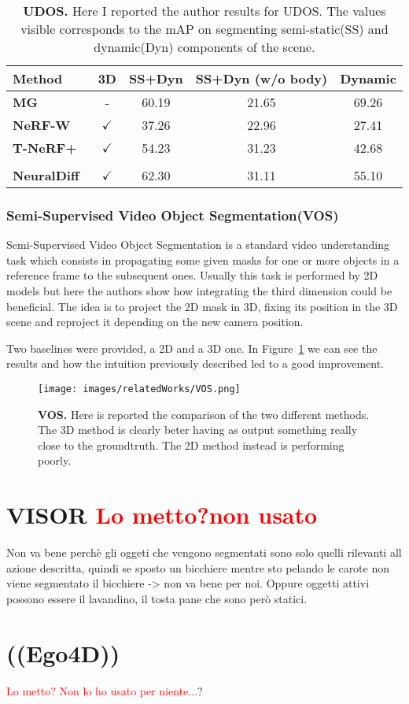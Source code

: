 \begin{table}
    \begin{tabular}{lcccc}
        \hline \textbf{Method} & \textbf{3D} & \textbf{SS+Dyn} & \textbf{SS+Dyn (w/o body)} &\textbf{ Dynamic} \\
        \hline \textbf{MG} ~\cite{MG} & - & 60.19 & 21.65 & 69.26 \\
        \textbf{NeRF-W} ~\cite{nerfw} & $\checkmark$ & 37.26 & 22.96 & 27.41 \\
        \textbf{T-NeRF+}~\cite{Tnerf} & $\checkmark$ & 54.23 & 31.23 & 42.68 \\
        & & & & \\
        \textbf{NeuralDiff}~\cite{neuraldiff}& $\checkmark$ & 62.30 & 31.11 & 55.10 \\
        \hline
        \end{tabular}
        \caption{\textbf{UDOS.} Here I reported the author results for UDOS. The values visible corresponds to the mAP on segmenting semi-static(SS) 
        and dynamic(Dyn) components of the scene.}\label{tab:UDOS}
\end{table}

\subsubsection{Semi-Supervised Video Object Segmentation(VOS)}
Semi-Supervised Video Object Segmentation is a standard video understanding task which consists in propagating some given masks for one or more
objects in a reference frame to the subsequent ones. Usually this task is performed by 2D models but here the authors show how integrating the third dimension
could be beneficial. The idea is to project the 2D mask in 3D, fixing its position in the 3D scene and reproject it depending on the new camera position.

Two baselines were provided, a 2D and a 3D one. In Figure~\ref{fig:VOS} we can see the results and how the intuition previously described led to a good improvement.
\begin{figure}
    \centering
    \texttt{[image: images/relatedWorks/VOS.png]} 
    \caption{\textbf{VOS.} Here is reported the comparison of the two different methods.
    The 3D method is clearly beter having as output something really close to the groundtruth. The 2D method instead is performing poorly.}\label{fig:VOS}
\end{figure}

\section{VISOR \textcolor{red}{Lo metto?non usato}}
Non va bene perchè gli oggeti che vengono segmentati sono solo quelli rilevanti all azione descritta, quindi se sposto un bicchiere mentre sto pelando 
le carote non viene segmentato il bicchiere -> non va bene per noi. Oppure oggetti attivi possono essere il lavandino, il tosta pane che sono
però statici.
\section{((Ego4D))}
\textcolor{red}{Lo metto? Non lo ho usato per niente...}?
